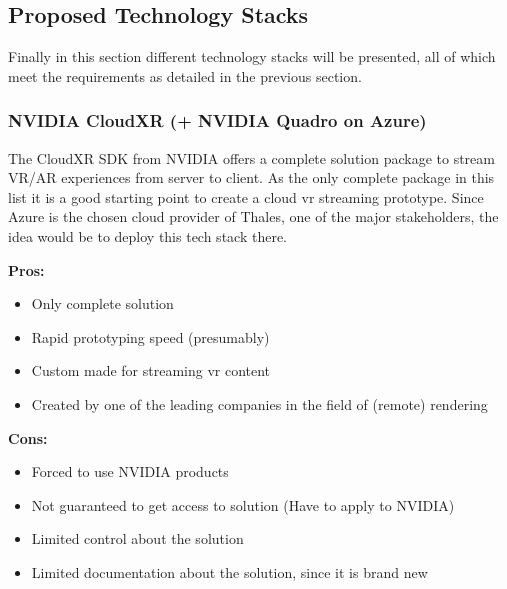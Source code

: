 \subsection{Proposed Technology Stacks}
Finally in this section different technology stacks will be presented, all of which meet the requirements as detailed in the previous section.
\subsubsection{NVIDIA CloudXR (+ NVIDIA Quadro on Azure)}
The CloudXR SDK from NVIDIA offers a complete solution package to stream VR/AR experiences from server to client. As the only complete package in this list it is a good starting point to create a cloud \acrshort{vr} streaming prototype. Since Azure is the chosen cloud provider of Thales, one of the major stakeholders, the idea would be to deploy this tech stack there. \\
\newline
\begin{varwidth}[t]{.5\textwidth}
\renewcommand\labelitemi{+}
\textbf{Pros:}
\begin{itemize}
\item Only complete solution
\item Rapid prototyping speed (presumably)
\item Custom made for streaming \acrshort{vr} content
\item Created by one of the leading companies in the field of (remote) rendering
\end{itemize}
\end{varwidth}
\hspace{4em}
\begin{varwidth}[t]{.5\textwidth}
\renewcommand\labelitemi{-}
\textbf{Cons:}
\begin{itemize}
\item Forced to use NVIDIA products
\item Not guaranteed to get access to solution (Have to apply to NVIDIA)
\item Limited control about the solution
\item Limited documentation about the solution, since it is brand new
\end{itemize}
\end{varwidth}

